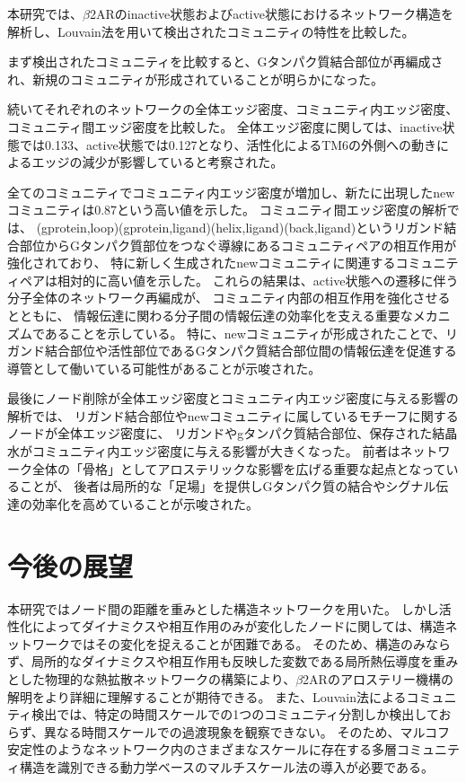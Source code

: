 本研究では、$\beta$2ARのinactive状態およびactive状態におけるネットワーク構造を解析し、Louvain法を用いて検出されたコミュニティの特性を比較した。


まず検出されたコミュニティを比較すると、Gタンパク質結合部位が再編成され、新規のコミュニティが形成されていることが明らかになった。


続いてそれぞれのネットワークの全体エッジ密度、コミュニティ内エッジ密度、コミュニティ間エッジ密度を比較した。
全体エッジ密度に関しては、inactive状態では0.133、active状態では0.127となり、活性化によるTM6の外側への動きによるエッジの減少が影響していると考察された。


全てのコミュニティでコミュニティ内エッジ密度が増加し、新たに出現したnewコミュニティは0.87という高い値を示した。
コミュニティ間エッジ密度の解析では、
(gprotein,loop)(gprotein,ligand)(helix,ligand)(back,ligand)というリガンド結合部位からGタンパク質部位をつなぐ導線にあるコミュニティペアの相互作用が強化されており、
特に新しく生成されたnewコミュニティに関連するコミュニティペアは相対的に高い値を示した。
これらの結果は、active状態への遷移に伴う分子全体のネットワーク再編成が、
コミュニティ内部の相互作用を強化させるとともに、
情報伝達に関わる分子間の情報伝達の効率化を支える重要なメカニズムであることを示している。
特に、newコミュニティが形成されたことで、リガンド結合部位や活性部位であるGタンパク質結合部位間の情報伝達を促進する導管として働いている可能性があることが示唆された。


最後にノード削除が全体エッジ密度とコミュニティ内エッジ密度に与える影響の解析では、
リガンド結合部位やnewコミュニティに属しているモチーフに関するノードが全体エッジ密度に、
リガンドやgタンパク質結合部位、保存された結晶水がコミュニティ内エッジ密度に与える影響が大きくなった。
前者はネットワーク全体の「骨格」としてアロステリックな影響を広げる重要な起点となっていることが、
後者は局所的な「足場」を提供しGタンパク質の結合やシグナル伝達の効率化を高めていることが示唆された。

\section{今後の展望}
本研究ではノード間の距離を重みとした構造ネットワークを用いた。
しかし活性化によってダイナミクスや相互作用のみが変化したノードに関しては、構造ネットワークではその変化を捉えることが困難である。
そのため、構造のみならず、局所的なダイナミクスや相互作用も反映した変数である局所熱伝導度\cite{yamato2022computational}を重みとした物理的な熱拡散ネットワークの構築により、$\beta$2ARのアロステリー機構の解明をより詳細に理解することが期待できる。
また、Louvain法によるコミュニティ検出では、特定の時間スケールでの1つのコミュニティ分割しか検出しておらず、異なる時間スケールでの過渡現象を観察できない。
そのため、マルコフ安定性\cite{amor2014uncovering}のようなネットワーク内のさまざまなスケールに存在する多層コミュニティ構造を識別できる動力学ベースのマルチスケール法の導入が必要である。
